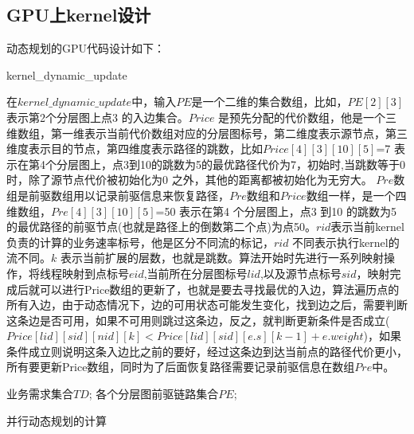 \subsection{GPU上kernel设计}
动态规划的GPU代码设计如下：
\begin{algorithm}[t]
\begin{algorithmic}[1]
\EndIf
\EndIf
\EndFor
\EndFunction
\end{algorithmic}
\caption{kernel\_dynamic\_update}
\label{KernelDynamic}
\end{algorithm}
在$kernel\_dynamic\_update$中，输入$PE$是一个二维的集合数组，比如，$PE[2][3]$表示第2个分层图上点3 的入边集合。$Price$ 是预先分配的代价数组，他是一个三维数组，第一维表示当前代价数组对应的分层图标号，第二维度表示源节点，第三维度表示目的节点，第四维度表示路径的跳数，比如$Price[4][3][10][5]$=7 表示在第4个分层图上，点3到10的跳数为5的最优路径代价为7，初始时,当跳数等于0 时，除了源节点代价被初始化为0 之外，其他的距离都被初始化为无穷大。
$Pre$数组是前驱数组用以记录前驱信息来恢复路径，$Pre$数组和$Price$数组一样，是一个四维数组，$Pre[4][3][10][5]$=50 表示在第4 个分层图上，点3 到10 的跳数为5的最优路径的前驱节点(也就是路径上的倒数第二个点)为点50。$rid$表示当前kernel 负责的计算的业务速率标号，他是区分不同流的标记，$rid$ 不同表示执行kernel的流不同。$k$ 表示当前扩展的层数，也就是跳数。算法开始时先进行一系列映射操作，将线程映射到点标号$eid$,当前所在分层图标号$lid$,以及源节点标号$sid$，映射完成后就可以进行Price数组的更新了，也就是要去寻找最优的入边，算法遍历点的所有入边，由于动态情况下，边的可用状态可能发生变化，找到边之后，需要判断这条边是否可用，如果不可用则跳过这条边，反之，就判断更新条件是否成立($Price[lid][sid][nid][k]<Price[lid][sid][e.s][k-1]+e.weight$)，如果条件成立则说明这条入边比之前的要好，经过这条边到达当前点的路径代价更小，所有要更新Price数组，同时为了后面恢复路径需要记录前驱信息在数组$Pre$中。
\begin{algorithm}[t]
\begin{algorithmic}[1]
\Require
业务需求集合$TD$;
各个分层图前驱链路集合$PE$;
\Else
{}
\EndIf
{}
\EndFor
\EndFor
\EndFor
\EndFor
{}
\EndFor
{}
\EndWhile
{}
\end{algorithmic}
\caption{{并行动态规划的计算}}
\label{ParaSPC}
\end{algorithm}

